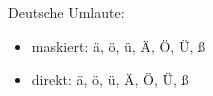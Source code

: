 \documentclass{article}
\begin{document}
\pagestyle{empty}

Deutsche Umlaute:
\begin{itemize}
	\item maskiert: \"a, \"o, \"u, \"A, \"O, \"U, \ss
	\item direkt: ä, ö, ü, Ä, Ö, Ü, ß
\end{itemize}
\end{document}
